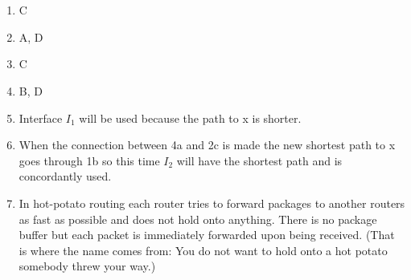 \documentclass[12pt, a4paper]{article}
\begin{document}
\section{} %
\begin{enumerate}[1]
	\item %
	C

	\item %
	A, D

	\item %
	C

	\item %
	B, D

	\item %
	Interface $I_1$ will be used because the path to x is shorter.

	\item %
	When the connection between 4a and 2c is made the new shortest path to x goes through 1b so this time $I_2$ will have the shortest path and is concordantly used.

	\item %
	In hot-potato routing each router tries to forward packages to another routers as fast as possible and does not hold onto anything. There is no package buffer but each packet is immediately forwarded upon being received. (That is where the name comes from: You do not want to hold onto a hot potato somebody threw your way.)
\end{enumerate}

\section{} %
\end{document}
